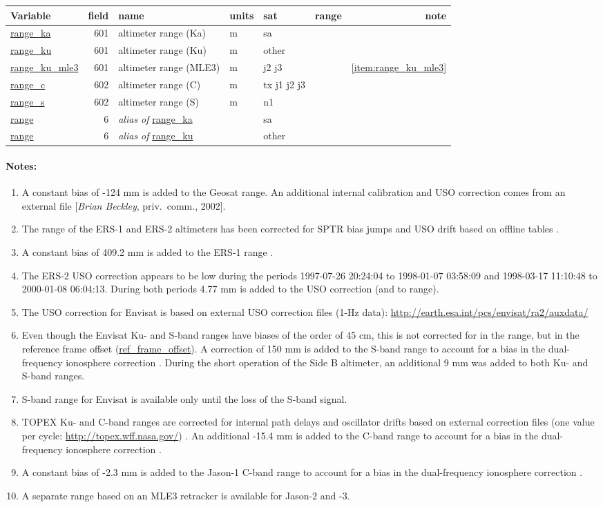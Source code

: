 \documentclass[a4paper,11pt,openany,natbib,nomargin]{thesis}
\makeatletter
\newcommand\var[1]{\url{#1}\index{variables!#1@\protect\url{#1}}}
\newcommand\alias[1]{\emph{alias of} \var{#1}}
\newenvironment{vartable}{
\begin{table}[ht]
\small
\begin{tabular}{lrllllr}
\hline
Variable & field & name & units & sat & range & note \\
\hline
}{
\hline
\end{tabular}
\end{table}
}
\newenvironment{notes}[1][Notes:]{\FloatBarrier\paragraph{#1}\begin{enumerate}}{\end{enumerate}}
\makeatother
\begin{document}
\begin{vartable}
\var{range_ka} & 601 & altimeter range (Ka) & m & sa & & \\
\var{range_ku} & 601 & altimeter range (Ku) & m & other & & \\
\var{range_ku_mle3} & 601 & altimeter range (MLE3) & m & j2 j3 & & \ref{item:range_ku_mle3} \\
\var{range_c}  & 602 & altimeter range (C) & m & tx j1 j2 j3 & & \\
\var{range_s}  & 602 & altimeter range (S) & m & n1 & & \\
\hline
\var{range} & 6 & \alias{range_ka} & & sa & & \\
\var{range} & 6 & \alias{range_ku} & & other & & \\
\end{vartable}

\begin{notes}
\item A constant bias of -124 mm is added to the Geosat range. An additional internal calibration and USO correction comes from an external file [\emph{Brian Beckley}, priv.\ comm., 2002].
\item The range of the ERS-1 and ERS-2 altimeters has been corrected for SPTR bias jumps and USO drift based on offline tables \citep{martini2000}.
\item A constant bias of 409.2 mm is added to the ERS-1 range \citep{francis1993b,stum1998a}.
\item The ERS-2 USO correction appears to be low during the periods 1997-07-26 20:24:04 to 1998-01-07 03:58:09 and 1998-03-17 11:10:48 to 2000-01-08 06:04:13. During both periods 4.77 mm is added to the USO correction (and to range).
\item The USO correction for Envisat is based on external USO correction files (1-Hz data): \url{http://earth.esa.int/pcs/envisat/ra2/auxdata/}
\item Even though the Envisat Ku- and S-band ranges have biases of the order of 45 cm, this is not corrected for in the range, but in the reference frame offset (\var{ref_frame_offset}). A correction of 150 mm is added to the S-band range to account for a bias in the dual-frequency ionosphere correction \citep{scharroo2010a}. During the short operation of the Side B altimeter, an additional 9 mm was added to both Ku- and S-band ranges.
\item S-band range for Envisat is available only until the loss of the S-band signal.
\item TOPEX Ku- and C-band ranges are corrected for internal path delays and oscillator drifts based on external correction files (one value per cycle: \url{http://topex.wff.nasa.gov/}) \citep{hayne1994}. An additional -15.4 mm is added to the C-band range to account for a bias in the dual-frequency ionosphere correction \citep{scharroo2010a}.
\item A constant bias of -2.3 mm is added to the Jason-1 C-band range to account for a bias in the dual-frequency ionosphere correction \citep{scharroo2010a}.
\item A separate range based on an MLE3 retracker is available for Jason-2 and -3.\label{item:range_ku_mle3}
\end{notes}
\end{document}
